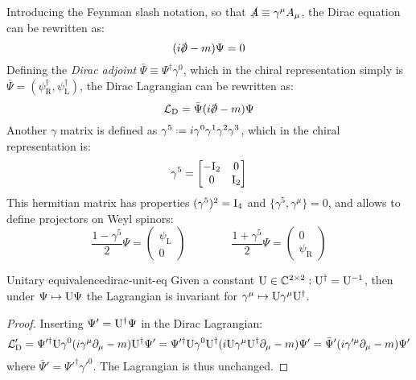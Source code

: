 Introducing the Feynman slash notation, so that $ \slashed{A} \equiv \gamma^\mu A_\mu $, the Dirac equation can be rewritten as:
\begin{equation}
  (i \slashed{\pa} - m) \Psi = 0
  \label{eq:1.86}
\end{equation}
Defining the \textit{Dirac adjoint} $ \bar{\Psi} \equiv \Psi^\dagger \gamma^0 $, which in the chiral representation simply is $ \bar{\Psi} = (\psi_\text{R}^\dagger, \psi_\text{L}^\dagger) $, the Dirac Lagrangian can be rewritten as:
\begin{equation}
  \mathcal{L}_\text{D} = \bar{\Psi} (i \slashed{\pa} - m) \Psi
  \label{eq:1.87}
\end{equation}
Another $ \gamma $ matrix is defined as $ \gamma^5 \defeq i \gamma^0 \gamma^1 \gamma^2 \gamma^3 $, which in the chiral representation is:
\begin{equation*}
  \gamma^5 =
  \begin{bmatrix}
    -\mathrm{I}_2 & 0 \\ 0 & \mathrm{I}_2
  \end{bmatrix}
\end{equation*}
This hermitian matrix has properties $ (\gamma^5)^2 = \mathrm{I}_4 $ and $ \{\gamma^5, \gamma^\mu\} = 0 $, and allows to define projectors on Weyl spinors:
\begin{equation}
  \frac{1 - \gamma^5}{2} \Psi =
  \begin{pmatrix}
    \psi_\text{L} \\ 0
  \end{pmatrix}
  \qquad \qquad
  \frac{1 + \gamma^5}{2} \Psi =
  \begin{pmatrix}
    0 \\ \psi_\text{R}
  \end{pmatrix}
  \label{eq:1.88}
\end{equation}

\begin{proposition}{Unitary equivalence}{dirac-unit-eq}
  Given a constant $ \mathrm{U} \in \mathbb{C}^{2 \times 2} : \mathrm{U}^\dagger = \mathrm{U}^{-1} $, then under $ \Psi \mapsto \mathrm{U} \Psi $ the Lagrangian is invariant for $ \gamma^\mu \mapsto \mathrm{U} \gamma^\mu \mathrm{U}^\dagger $.

  \tcblower

  \begin{proof}
    Inserting $ \Psi' = \mathrm{U}^\dagger \Psi $ in the Dirac Lagrangian:
    \begin{equation*}
      \mathcal{L}'_\text{D} = \Psi'^\dagger \mathrm{U} \gamma^0 (i \gamma^\mu \partial_\mu - m) \mathrm{U}^\dagger \Psi' = \Psi'^\dagger \mathrm{U} \gamma^0 \mathrm{U}^\dagger (i \mathrm{U} \gamma^\mu \mathrm{U}^\dagger \partial_\mu - m) \Psi' = \bar{\Psi}' (i \gamma'^\mu \partial_\mu - m) \Psi'
    \end{equation*}
    where $ \bar{\Psi}' = \Psi'^\dagger \gamma'^0 $. The Lagrangian is thus unchanged.
  \end{proof}
\end{proposition}

